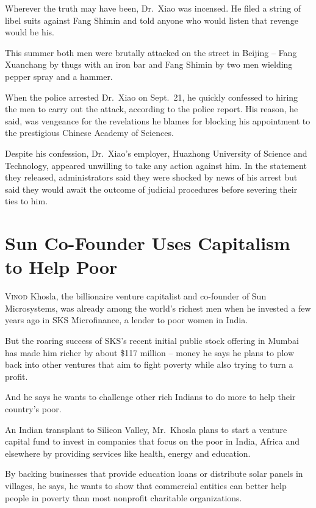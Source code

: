 ﻿\documentclass[12pt]{article}
\begin{document}
Wherever the truth may have been, Dr.~Xiao was incensed. He filed a string of libel suits against
Fang Shimin and told anyone who would listen that revenge would be his.

This summer both men were brutally attacked on the street in Beijing -- Fang Xuanchang by thugs with
an iron bar and Fang Shimin by two men wielding pepper spray and a hammer.

When the police arrested Dr.~Xiao on Sept.~21, he quickly confessed to hiring the men to carry out
the attack, according to the police report. His reason, he said, was vengeance for the revelations
he blames for blocking his appointment to the prestigious Chinese Academy of Sciences.

Despite his confession, Dr.~Xiao's employer, Huazhong University of Science and Technology, appeared
unwilling to take any action against him. In the statement they released, administrators said they
were shocked by news of his arrest but said they would await the outcome of judicial procedures
before severing their ties to him.

\section{Sun Co-Founder Uses Capitalism to Help Poor}

\lettrine{V}{inod} Khosla, the billionaire venture capitalist and co-founder
of Sun Microsystems, was already among the world's richest men when he invested a few years ago in
SKS Microfinance, a lender to poor women in India.

But the roaring success of SKS's recent initial public stock offering in Mumbai has made him richer
by about \$117 million -- money he says he plans to plow back into other ventures that aim to fight
poverty while also trying to turn a profit.

And he says he wants to challenge other rich Indians to do more to help their country's poor.

An Indian transplant to Silicon Valley, Mr.~Khosla plans to start a venture capital fund to invest
in companies that focus on the poor in India, Africa and elsewhere by providing services like
health, energy and education.

By backing businesses that provide education loans or distribute solar panels in villages, he says,
he wants to show that commercial entities can better help people in poverty than most nonprofit
charitable organizations.
\end{document}
